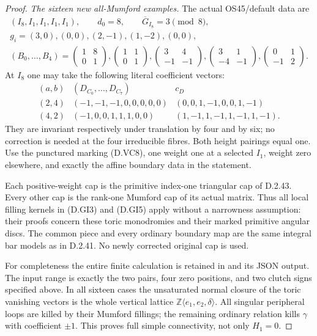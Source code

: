 \begin{proof}
\emph{The sixteen new all-Mumford examples.}
The actual OS45/default data are
\[
 \begin{gathered}
 (I_8,I_1,I_1,I_1,I_1),\qquad d_0=8,\qquad
 \overline G_{I_8}=3\pmod8,\\
 g_i=(3,0),(0,0),(2,-1),(1,-2),(0,0),\\
 (B_0,\ldots,B_4)=\begin{pmatrix}1&8\\0&1\end{pmatrix},
 \begin{pmatrix}1&1\\0&1\end{pmatrix},
 \begin{pmatrix}3&4\\-1&-1\end{pmatrix},
 \begin{pmatrix}3&1\\-4&-1\end{pmatrix},
 \begin{pmatrix}0&1\\-1&2\end{pmatrix}.
 \end{gathered}                                             \tag{D.VC9}
\]
At $I_8$ one may take the following literal coefficient vectors:
\[
\begin{array}{c|c|c}
 (a,b)&(D_{C_0},\ldots,D_{C_7})&c_D\\ \hline
 (2,4)&(-1,-1,-1,0,0,0,0,0)&(0,0,1,-1,0,0,1,-1)\\
 (4,2)&(-1,0,0,1,1,1,0,0)&(1,-1,1,-1,1,-1,1,-1).
\end{array}                                                \tag{D.VC10}
\]
They are invariant respectively under translation by four and by six;
no correction is needed at the four irreducible fibres. Both height
pairings equal one. Use the punctured marking (D.VC8), one weight one
at a selected $I_1$, weight zero elsewhere, and exactly the affine
boundary data in the statement.

Each positive-weight cap is the primitive index-one triangular cap
of D.2.43. Every other cap is the rank-one Mumford cap of its actual
matrix. Thus all local filling kernels in (D.GI3) and (D.GI5) apply
without a narrowness assumption: their proofs concern these toric
monodromies and their marked primitive angular discs. The common
piece and every ordinary boundary map are the same integral bar
models as in D.2.41. No newly corrected original cap is used.

For completeness the entire finite calculation is retained in
 and its JSON output.
The input range is exactly the two pairs, four zero positions,
and two clutch signs specified above. In all sixteen cases the
unsaturated normal closure of the toric vanishing vectors is the
whole vertical lattice $\mathbb Z\langle e_1,e_2,\delta\rangle$.
All singular peripheral loops are killed by their Mumford fillings;
the remaining ordinary relation kills $\gamma$ with coefficient
$\pm1$. This proves full simple connectivity, not only $H_1=0$.


\end{proof}
